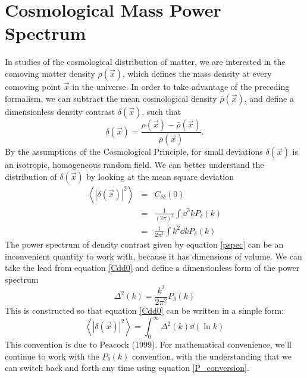 \section{Cosmological Mass Power Spectrum}
\label{app:sec:masspower}
In studies of the cosmological distribution of matter, we are interested
in the comoving matter density $\rho(\vec{x})$, which defines the mass 
density at every comoving point $\vec{x}$ in the universe.  In order
to take advantage of the preceding formalism, we can subtract the mean
cosmological density $\bar{\rho}(\vec{x})$, and define a dimensionless
density contrast $\delta(\vec{x})$, such that
\begin{equation}
  \delta(\vec{x}) = \frac{\rho(\vec{x}) - \bar{\rho}(\vec{x})}{\bar{\rho}(\vec{x})}.
\end{equation}
By the assumptions of the Cosmological Principle, for small
deviations $\delta(\vec x)$ is an isotropic, homogeneous random field.  
We can better understand the distribution of $\delta(\vec x)$ by looking
at the mean square deviation
\begin{eqnarray}
  \label{Cdd0}
  \left\langle|\delta(\vec x)|^2\right\rangle 
  &=& C_{\delta\delta}(0)\nonumber\\
  &=& \frac{1}{(2\pi)^3}\int \dd^3 kP_\delta(k)\nonumber\\
  &=& \frac{1}{2\pi^2}\int k^2\dd k P_\delta(k)
\end{eqnarray}
The power spectrum of density contrast given by equation \ref{pspec}
can be an inconvenient quantity to work with, because it has dimensions
of volume.  We can take the lead from equation \ref{Cdd0} and define
a dimensionless form of the power spectrum
\begin{equation}
  \label{P_conversion}
 \Delta^2(k) = \frac{k^3}{2\pi^2} P_\delta(k)
\end{equation}
This is constructed so that equation \ref{Cdd0} can be written in a
simple form:
\begin{equation}
  \left\langle|\delta(\vec x)|^2\right\rangle 
  = \int_0^\infty \Delta^2(k)\dd(\ln k)
\end{equation}
This convention is due to Peacock (1999).
For mathematical convenience, we'll continue to work with 
the $P_\delta(k)$ convention,
with the understanding that we can switch back and forth any time using
equation \ref{P_conversion}. 


